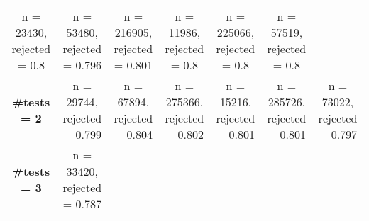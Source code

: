 \documentclass[
]{article}
\begin{document}
\begin{longtable}[]{@{}ccccccc@{}}
\begin{minipage}[t]{0.12\columnwidth}
n = 23430, rejected = 0.8\strut
\end{minipage} & \begin{minipage}[t]{0.12\columnwidth}\centering
n = 53480, rejected = 0.796\strut
\end{minipage} & \begin{minipage}[t]{0.13\columnwidth}\centering
n = 216905, rejected = 0.801\strut
\end{minipage} & \begin{minipage}[t]{0.12\columnwidth}\centering
n = 11986, rejected = 0.8\strut
\end{minipage} & \begin{minipage}[t]{0.13\columnwidth}\centering
n = 225066, rejected = 0.8\strut
\end{minipage} & \begin{minipage}[t]{0.13\columnwidth}\centering
n = 57519, rejected = 0.8\strut
\end{minipage}\tabularnewline
\begin{minipage}[t]{0.07\columnwidth}\centering
\textbf{\#tests = 2}\strut
\end{minipage} & \begin{minipage}[t]{0.12\columnwidth}\centering
n = 29744, rejected = 0.799\strut
\end{minipage} & \begin{minipage}[t]{0.12\columnwidth}\centering
n = 67894, rejected = 0.804\strut
\end{minipage} & \begin{minipage}[t]{0.13\columnwidth}\centering
n = 275366, rejected = 0.802\strut
\end{minipage} & \begin{minipage}[t]{0.12\columnwidth}\centering
n = 15216, rejected = 0.801\strut
\end{minipage} & \begin{minipage}[t]{0.13\columnwidth}\centering
n = 285726, rejected = 0.801\strut
\end{minipage} & \begin{minipage}[t]{0.13\columnwidth}\centering
n = 73022, rejected = 0.797\strut
\end{minipage}\tabularnewline
\begin{minipage}[t]{0.07\columnwidth}\centering
\textbf{\#tests = 3}\strut
\end{minipage} & \begin{minipage}[t]{0.12\columnwidth}\centering
n = 33420, rejected = 0.787\strut
\end{minipage} & \begin{minipage}[t]{0.12\columnwidth}\centering

\end{minipage}
\end{longtable}
\end{document}
